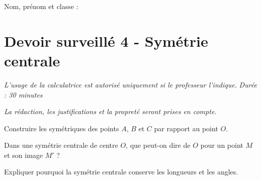 \documentclass[a4paper,10pt]{report}
\begin{document}
\pagestyle{empty}
\noindent Nom, prénom et classe : \dotfill

\section*{Devoir surveillé 4 - Symétrie centrale}

\noindent \textit{L'usage de la calculatrice est autorisé uniquement si le professeur l'indique.} \hfill \textit{Durée : 30 minutes}

\medskip
\noindent \textit{La rédaction, les justifications et la propreté seront prises en compte.}


\begin{ex}[Construction]
Construire les symétriques des points $A$, $B$ et $C$ par rapport au point $O$.
\medskip\noindent\grandscarreaux{\linewidth}{6cm}
\end{ex}
\begin{ex}[Propriétés]
Dans une symétrie centrale de centre $O$, que peut-on dire de $O$ pour un point $M$ et son image $M'$ ?
\medskip\noindent\grandscarreaux{\linewidth}{3cm}
\end{ex}
\begin{ex}[Raisonner]
Expliquer pourquoi la symétrie centrale conserve les longueurs et les angles.
\medskip\noindent\grandscarreaux{\linewidth}{3cm}
\end{ex}
\end{document}
